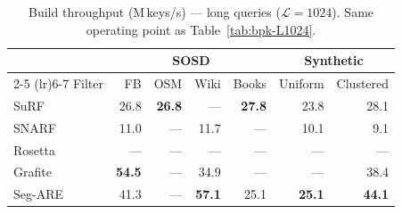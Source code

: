 \begin{table}[H]
    \centering
    \small
    \begin{tabular}{@{}lrrrrrr@{}}
        \toprule
        & \multicolumn{4}{c}{SOSD} & \multicolumn{2}{c}{Synthetic} \\
        \cmidrule(lr){2-5} \cmidrule(lr){6-7}
        Filter & FB & OSM & Wiki & Books & Uniform & Clustered \\
        \midrule
        SuRF    & 26.8                  & \textbf{26.8}         & \textnormal{---} & \textbf{27.8}         & 23.8                  & 28.1                  \\
        SNARF   & 11.0                  & \textnormal{---}       & 11.7             & \textnormal{---}       & 10.1                  & 9.1                   \\
        Rosetta & \textnormal{---}       & \textnormal{---}       & \textnormal{---} & \textnormal{---}       & \textnormal{---}       & \textnormal{---}       \\
        Grafite & \textbf{54.5}         & \textnormal{---}       & 34.9             & \textnormal{---}       & \textnormal{---}       & 38.4                  \\
        Seg-ARE & 41.3                  & \textnormal{---}       & \textbf{57.1}    & 25.1                  & \textbf{25.1}         & \textbf{44.1}         \\
        \bottomrule
    \end{tabular}
    \caption{Build throughput (M\,keys/s) --- long queries ($\mathcal{L}=1024$).
             Same operating point as Table~\ref{tab:bpk-L1024}.}
    \label{tab:throughput-L1024}
\end{table}

